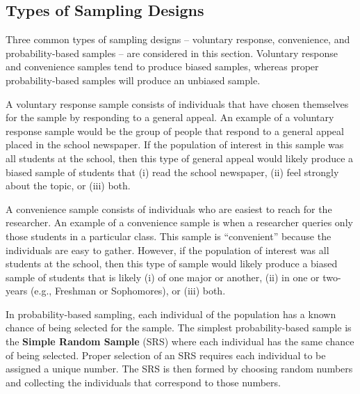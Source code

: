 \documentclass[10pt,openany]{book}\usepackage[]{graphicx}\usepackage[]{color}
\begin{document}

\subsection{Types of Sampling Designs}
Three common types of sampling designs -- voluntary response, convenience, and probability-based samples -- are considered in this section.  Voluntary response and convenience samples tend to produce biased samples, whereas proper probability-based samples will produce an unbiased sample.

A voluntary response sample consists of individuals that have chosen themselves for the sample by responding to a general appeal.  An example of a voluntary response sample would be the group of people that respond to a general appeal placed in the school newspaper.  If the population of interest in this sample was all students at the school, then this type of general appeal would likely produce a biased sample of students that (i) read the school newspaper, (ii) feel strongly about the topic, or (iii) both.

A convenience sample consists of individuals who are easiest to reach for the researcher.  An example of a convenience sample is when a researcher queries only those students in a particular class.  This sample is ``convenient'' because the individuals are easy to gather.  However, if the population of interest was all students at the school, then this type of sample would likely produce a biased sample of students that is likely (i) of one major or another, (ii) in one or two-years (e.g., Freshman or Sophomores), or (iii) both.


\vspace{-12pt}

\vspace{-12pt}

In probability-based sampling, each individual of the population has a known chance of being selected for the sample.  The simplest probability-based sample is the \textbf{Simple Random Sample} (SRS) where each individual has the same chance of being selected.  Proper selection of an SRS requires each individual to be assigned a unique number.  The SRS is then formed by choosing random numbers and collecting the individuals that correspond to those numbers.
\end{document}
